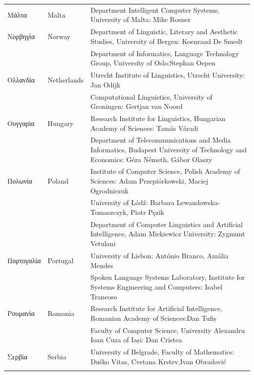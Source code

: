 \begin{longtable}{@{}llp{113mm}@{}}
  Μάλτα & \textcolor{grey1}{Malta} & Department Intelligent Computer Systems, University of Malta: Mike Rosner\\ \addlinespace
  Νορβηγία & \textcolor{grey1}{Norway} & Department of Linguistic, Literary and Aesthetic Studies, University of Bergen: Koenraad De Smedt\\ \addlinespace 
  & & Department of Informatics, Language Technology Group, University of Oslo:\newline Stephan Oepen \\ \addlinespace
  Ολλανδία & \textcolor{grey1}{Netherlands} & Utrecht Institute of Linguistics, Utrecht University: Jan Odijk\\ \addlinespace 
  & & Computational Linguistics, University of Groningen: Gertjan van Noord\\ \addlinespace
  Ουγγαρία & \textcolor{grey1}{Hungary} & Research Institute for Linguistics, Hungarian Academy of Sciences: Tamás Váradi\\  \addlinespace
  & & Department of Telecommunications and Media Informatics, Budapest University of Technology and Economics: Géza Németh, Gábor Olaszy\\ \addlinespace
  Πολωνία & \textcolor{grey1}{Poland} & Institute of Computer Science, Polish Academy of Sciences: Adam Przepiórkowski, Maciej Ogrodniczuk \\ \addlinespace
  & & University of Łódź: Barbara Lewandowska-Tomaszczyk, Piotr Pęzik\\ \addlinespace
  & & Department of Computer Linguistics and Artificial Intelligence, Adam Mickiewicz University: Zygmunt Vetulani \\ \addlinespace
  Πορτογαλία & \textcolor{grey1}{Portugal} & University of Lisbon: António Branco, Amália Mendes \\ \addlinespace
  & & Spoken Language Systems Laboratory, Institute for Systems Engineering and Computers: Isabel Trancoso \\ \addlinespace
  Ρουμανία & \textcolor{grey1}{Romania} & Research Institute for Artificial Intelligence, Romanian Academy of Sciences:\newline Dan Tufiș \\ \addlinespace
  & & Faculty of Computer Science, University Alexandru Ioan Cuza of Iași: Dan Cristea \\ \addlinespace
  Σερβία & \textcolor{grey1}{Serbia} & University of Belgrade, Faculty of Mathematics: Duško Vitas, Cvetana Krstev,\newline Ivan Obradović \\ \addlinespace

\end{longtable}
